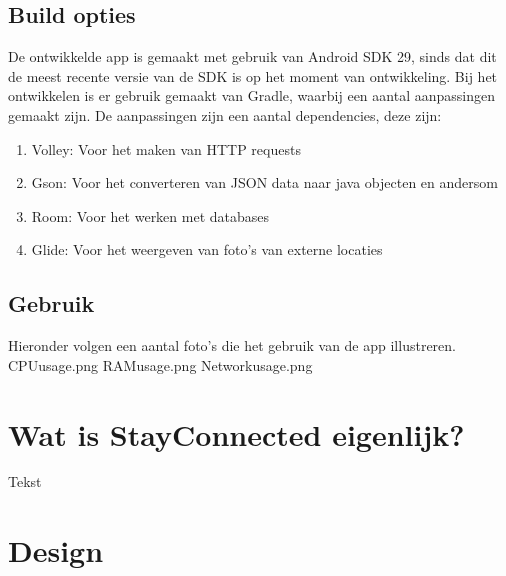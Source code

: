 \documentclass[dutch]{report}
\begin{document}
	\subsection{Build opties}
	De ontwikkelde app is gemaakt met gebruik van Android SDK 29, sinds dat dit de meest recente versie van de SDK is op het moment van ontwikkeling.
	Bij het ontwikkelen is er gebruik gemaakt van Gradle, waarbij een aantal aanpassingen gemaakt zijn. De aanpassingen zijn  een aantal dependencies, deze zijn:
	 \begin{enumerate}
	 	\item Volley: Voor het maken van HTTP requests
	 	\item Gson: Voor het converteren van JSON data naar java objecten en andersom
	 	\item Room: Voor het werken met databases
	 	\item Glide: Voor het weergeven van foto's van externe locaties
	 \end{enumerate}
 
 	\subsection{Gebruik}
 	Hieronder volgen een aantal foto's die het gebruik van de app illustreren.
 	CPUusage.png
 	RAMusage.png
 	Networkusage.png
	
	\section{Wat is StayConnected eigenlijk?}
	Tekst
	
	\newpage
	
	\section{Design}
	
\end{document}
